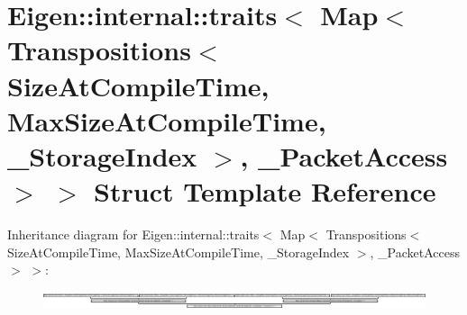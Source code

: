 \hypertarget{struct_eigen_1_1internal_1_1traits_3_01_map_3_01_transpositions_3_01_size_at_compile_time_00_01_1a60846531a8bf67fbbfd4180820bbd1}{}\section{Eigen\+:\+:internal\+:\+:traits$<$ Map$<$ Transpositions$<$ Size\+At\+Compile\+Time, Max\+Size\+At\+Compile\+Time, \+\_\+\+Storage\+Index $>$, \+\_\+\+Packet\+Access $>$ $>$ Struct Template Reference}
\label{struct_eigen_1_1internal_1_1traits_3_01_map_3_01_transpositions_3_01_size_at_compile_time_00_01_1a60846531a8bf67fbbfd4180820bbd1}
Inheritance diagram for Eigen\+:\+:internal\+:\+:traits$<$ Map$<$ Transpositions$<$ Size\+At\+Compile\+Time, Max\+Size\+At\+Compile\+Time, \+\_\+\+Storage\+Index $>$, \+\_\+\+Packet\+Access $>$ $>$\+:\begin{figure}[H]
\begin{center}
\leavevmode
\includegraphics[height=0.509091cm]{struct_eigen_1_1internal_1_1traits_3_01_map_3_01_transpositions_3_01_size_at_compile_time_00_01_1a60846531a8bf67fbbfd4180820bbd1}
\end{center}
\end{figure}
